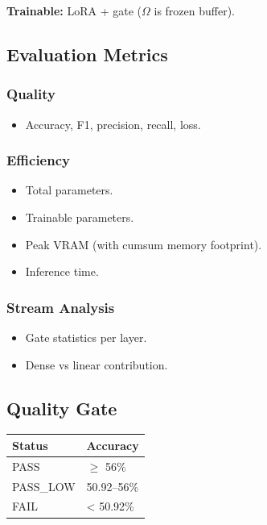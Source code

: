 \textbf{Trainable:} LoRA + gate ($\Omega$ is frozen buffer).

\subsection{Evaluation Metrics}

\subsubsection{Quality}
\begin{itemize}
\item Accuracy, F1, precision, recall, loss.

\end{itemize}
\subsubsection{Efficiency}
\begin{itemize}
\item Total parameters.
\item Trainable parameters.
\item Peak VRAM (with cumsum memory footprint).
\item Inference time.

\end{itemize}
\subsubsection{Stream Analysis}
\begin{itemize}
\item Gate statistics per layer.
\item Dense vs linear contribution.

\end{itemize}
\subsection{Quality Gate}

\begin{table}[H]
\centering
\small
\begin{tabular}{ll}
\toprule
\textbf{Status} & \textbf{Accuracy} \\
\midrule
PASS & $\ge$ 56\% \\
PASS\_LOW & 50.92--56\% \\
FAIL & < 50.92\% \\
\bottomrule
\end{tabular}
\end{table}

